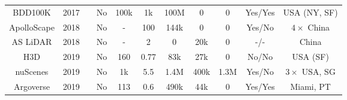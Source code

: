 \documentclass[10pt,comsoc]{IEEEtran}
\begin{document}
\begin{table}[!t]
{\begin{tabular}{|c|c|c|c|c|c|c|c|c|c|c|}
	BDD100K\cite{yu2018bdd100k}               & 2017          &                                                                                 & No                                                        & 100k      & 1k        & 100M                                                  & 0                                                    & 0                                                    & Yes/Yes    & USA (NY, SF)                  \\ \cline{1-2} \cline{4-11} 
	ApolloScape\cite{huang2019apolloscape}           & 2018          &                                                                                 & No                                                        & -         & 100       & 144k                                                  & 0                                                    & 0                                                    & Yes/No     & $4 \times$ China        \\ \cline{1-2} \cline{4-11} 
	AS LiDAR\cite{ma2019trafficpredict}              & 2018          &                                                                                 & No                                                        & -         & 2         & 0                                                     & 20k                                                  & 0                                                    & -/-          & China                   \\ \cline{1-2} \cline{4-11} 
	H3D\cite{patil2019h3d}                   & 2019          &                                                                                 & No                                                        & 160       & 0.77      & 83k                                                   & 27k                                                  & 0                                                    & No/No      & USA (SF)                      \\ \cline{1-2} \cline{4-11} 
	nuScenes\cite{caesar2020nuscenes}              & 2019          &                                                                                 & No                                                        & 1k        & 5.5       & 1.4M                                                  & 400k                                                 & 1.3M                                                 & Yes/No     & $3 \times$ USA, SG      \\ \cline{1-2} \cline{4-11} 
	Argoverse\cite{chang2019argoverse}             & 2019          &                                                                                 & No                                                        & 113       & 0.6       & 490k                                                  & 44k                                                  & 0                                                    & Yes/Yes    & Miami, PT               \\ \cline{1-2} \cline{4-11} 

\end{tabular}}
\end{table}
\end{document}
